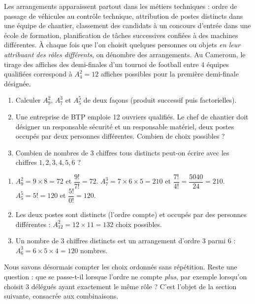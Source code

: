 \documentclass[11pt]{article}
\newcommand{\cle}[1]{{\popxbold\color{popdark}#1}}
\begin{document}
\begin{savaistu}
Les arrangements apparaissent partout dans les métiers techniques : ordre de passage de véhicules au contrôle technique, attribution de postes distincts dans une équipe de chantier, classement des candidats à un concours d'entrée dans une école de formation, planification de tâches successives confiées à des machines différentes. À chaque fois que l'on choisit quelques personnes ou objets \emph{en leur attribuant des rôles différents}, on dénombre des arrangements. Au Cameroun, le tirage des affiches des demi-finales d'un tournoi de football entre 4 équipes qualifiées correspond à $A_4^2 = 12$ affiches possibles pour la première demi-finale désignée.
\end{savaistu}

\begin{exercice}[À faire]
\begin{enumerate}
\item Calculer $A_9^2$, $A_7^3$ et $A_5^5$ de deux façons (produit successif puis factorielles).
\item Une entreprise de BTP emploie 12 ouvriers qualifiés. Le chef de chantier doit désigner un responsable sécurité et un responsable matériel, deux postes occupés par deux personnes différentes. Combien de choix possibles ?
\item Combien de nombres de 3 chiffres tous distincts peut-on écrire avec les chiffres $1, 2, 3, 4, 5, 6$ ?
\end{enumerate}
\end{exercice}

\begin{corrige}[Exercice]
\begin{enumerate}
\item $A_9^2 = 9 \times 8 = 72$ et $\dfrac{9!}{7!} = 72$. $A_7^3 = 7 \times 6 \times 5 = 210$ et $\dfrac{7!}{4!} = \dfrac{5040}{24} = 210$. $A_5^5 = 5! = 120$ et $\dfrac{5!}{0!} = 120$.
\item Les deux postes sont distincts (l'ordre compte) et occupés par des personnes différentes : $A_{12}^2 = 12 \times 11 = 132$ choix possibles.
\item Un nombre de 3 chiffres distincts est un arrangement d'ordre 3 parmi 6 : $A_6^3 = 6 \times 5 \times 4 = 120$ nombres.
\end{enumerate}
\end{corrige}

Nous savons désormais compter les choix ordonnés sans répétition. Reste une question : que se passe-t-il lorsque l'ordre ne compte \emph{plus}, par exemple lorsqu'on choisit 3 délégués ayant exactement le même rôle ? C'est l'objet de la section suivante, consacrée aux \cle{combinaisons}.
\end{document}
